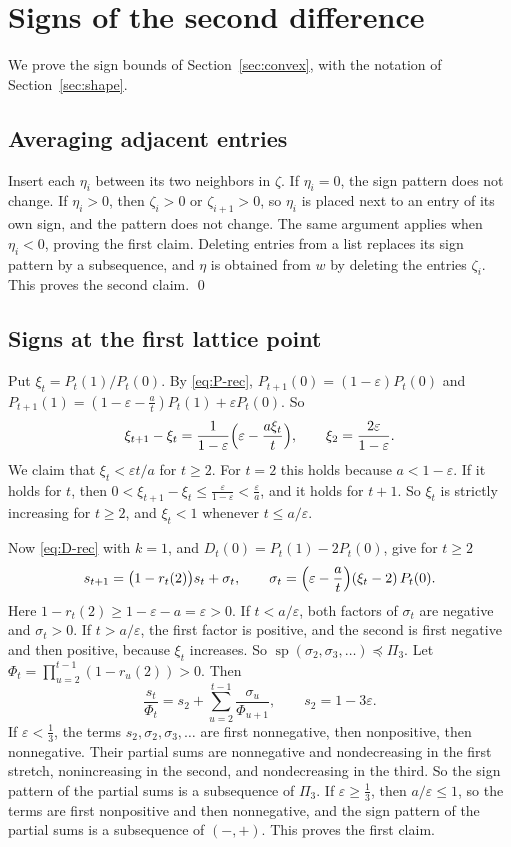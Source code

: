 \section{Signs of the second difference}\label{app:signs}
We prove the sign bounds of Section~\ref{sec:convex}, with the notation of Section~\ref{sec:shape}.

\subsection{Averaging adjacent entries}\label{app:signs-step}

Insert each $\eta_i$ between its two neighbors in $\zeta$. If $\eta_i=0$, the
sign pattern does not change. If $\eta_i>0$, then $\zeta_i>0$ or
$\zeta_{i+1}>0$, so $\eta_i$ is placed next to an entry of its own sign, and
the pattern does not change. The same argument applies when $\eta_i<0$, proving the first claim. Deleting entries from a list replaces its sign pattern by a
subsequence, and $\eta$ is obtained from $w$ by deleting the entries
$\zeta_i$. This proves the second claim. \qed

\subsection{Signs at the first lattice point}\label{app:signs-level}

Put $\xi_t=P_t(1)/P_t(0)$. By \eqref{eq:P-rec}, $P_{t+1}(0)=(1-\varepsilon)P_t(0)$
and $P_{t+1}(1)=(1-\varepsilon-\frac at)P_t(1)+\varepsilon P_t(0)$. So
\[
 \xi_{t+1}-\xi_t=\frac1{1-\varepsilon}\Bigl(\varepsilon-\frac{a\xi_t}t\Bigr),
 \qquad\xi_2=\frac{2\varepsilon}{1-\varepsilon}.
\]
We claim that $\xi_t<\varepsilon t/a$ for $t\ge2$. For $t=2$ this holds
because $a<1-\varepsilon$. If it holds for $t$, then
$0<\xi_{t+1}-\xi_t\le\frac\varepsilon{1-\varepsilon}<\frac\varepsilon a$,
and it holds for $t+1$. So $\xi_t$ is strictly increasing for $t\ge2$, and
$\xi_t<1$ whenever $t\le a/\varepsilon$.

Now \eqref{eq:D-rec} with $k=1$, and $D_t(0)=P_t(1)-2P_t(0)$, give for $t\ge2$
\[
 s_{t+1}=\bigl(1-r_t(2)\bigr)s_t+\sigma_t,\qquad
 \sigma_t=\Bigl(\varepsilon-\frac at\Bigr)(\xi_t-2)\,P_t(0).
\]
Here $1-r_t(2)\ge1-\varepsilon-a=\varepsilon>0$. If $t<a/\varepsilon$, both
factors of $\sigma_t$ are negative and $\sigma_t>0$. If $t>a/\varepsilon$, the
first factor is positive, and the second is first negative and then positive,
because $\xi_t$ increases. So
$\operatorname{sp}(\sigma_2,\sigma_3,\dots)\preceq\Pi_3$. Let
$\Phi_t=\prod_{u=2}^{t-1}(1-r_u(2))>0$. Then
\[
 \frac{s_t}{\Phi_t}=s_2+\sum_{u=2}^{t-1}\frac{\sigma_u}{\Phi_{u+1}},\qquad
 s_2=1-3\varepsilon .
\]
If $\varepsilon<\frac13$, the terms $s_2,\sigma_2,\sigma_3,\dots$ are first
nonnegative, then nonpositive, then nonnegative. Their partial sums are
nonnegative and nondecreasing in the first stretch, nonincreasing in the
second, and nondecreasing in the third. So the sign pattern of the partial
sums is a subsequence of $\Pi_3$. If $\varepsilon\ge\frac13$, then
$a/\varepsilon\le1$, so the terms are first nonpositive and then nonnegative,
and the sign pattern of the partial sums is a subsequence of $(-,+)$. This
proves the first claim.


